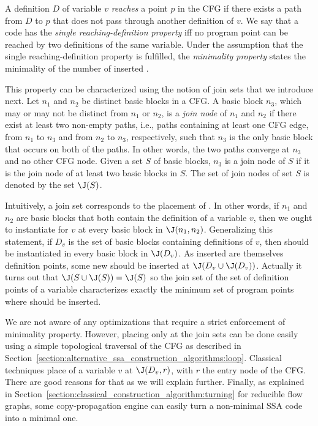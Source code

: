 A definition $D$ of variable $v$ \emph{reaches} a point $p$ in the CFG
if there exists a path from $D$ to $p$ that does not pass through another
definition of $v$. We say that a code has the \emph{single reaching-definition property} iff no program point can be reached by two definitions of the same variable. 
Under the assumption that the single reaching-definition property is fulfilled, the \emph{minimality property} states the minimality of the number of inserted \phifuns.

This property can be characterized using the notion of join sets that we introduce next.
Let $n_{1}$ and $n_{2}$ be distinct basic blocks in a CFG. A basic block
$n_{3}$, which may or may not be distinct from $n_{1}$ or $n_{2}$, is 
a \emph{join node} of $n_{1}$ and $n_{2}$ if there exist at least two
non-empty paths, i.e., paths containing at least one CFG edge, from 
$n_{1}$ to $n_{3}$ and from $n_{2}$ to $n_{3}$, respectively, such that
$n_{3}$ is the only basic block that occurs on both of the paths. In
other words, the two paths converge at $n_{3}$ and no other CFG node. 
Given a set $S$ of basic blocks, $n_{3}$ is a join node of $S$ if it
is the join node of at least two basic blocks in $S$. The set of join
nodes of set $S$ is denoted by the set $\J(S)$. 

Intuitively, a join set corresponds to the placement of \phifuns.
In other words, if $n_{1}$ and $n_{2}$ are basic blocks that both
contain the definition of a variable $v$, then we ought to instantiate
\phifuns for $v$ at every basic block in $\J(n_{1}, n_{2})$. 
Generalizing this statement, if $D_v$ is the set of basic blocks containing
definitions of $v$, then \phifuns should be instantiated in
every basic block in $\J(D_v)$. As inserted \phifuns are themselves 
definition points, some new \phifuns should be inserted at $\J(D_v\cup\J(D_v))$. 
Actually it turns out that $\J(S\cup\J(S))=\J(S)$ so the join set of the set of definition points of a variable characterizes exactly the minimum set of program points where \phifuns should be inserted.

We are not aware of any optimizations that require a strict enforcement of minimality property.
However, placing \phifuns only at the join sets can be done easily using a simple topological traversal of the CFG as described in Section~\ref{section:alternative_ssa_construction_algorithms:loop}. Classical techniques place \phifuns of a variable $v$ at $\J(D_v,r)$, with $r$ the entry node of the CFG. There are good reasons for that as we will explain further. Finally, as explained in Section~\ref{section:classical_construction_algorithm:turning} for reducible flow graphs, some copy-propagation engine can easily turn a non-minimal SSA code into a minimal one.

